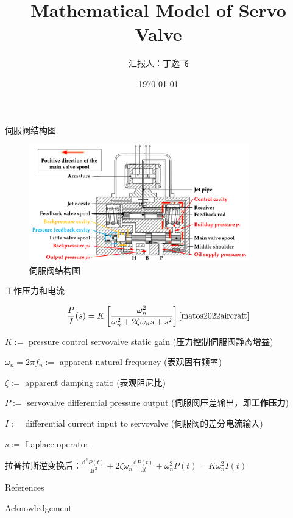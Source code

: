\documentclass[12pt,aspectratio=169]{beamer}
\title{Mathematical Model of Servo Valve}
\author{汇报人：丁逸飞}
\date{\today}
\begin{document}
\maketitle
\footnotesize

\begin{frame}{伺服阀结构图}

  \begin{figure}
    \begin{center}
      \includegraphics[width=0.85\textwidth]{fig/structure.png}
    \end{center}
    \caption{伺服阀结构图\cite{huang2022analysis}}\label{fig:1}
  \end{figure}

\end{frame}

\begin{frame}{工作压力和电流}

  \[
    \frac{P}{I}(s)=K\left[\frac{\omega_n^2}{\omega_n^2+2\zeta\omega_ns+s^2}\right]\text{\cite{matos2022aircraft}}
  \]

  $K:=$ pressure control servovalve static gain (压力控制伺服阀静态增益)

  $\omega_n=2\pi f_n:=$ apparent natural frequency (表观固有频率)

  $\zeta:=$ apparent damping ratio (表观阻尼比)

  $P:=$ servovalve differential pressure output (伺服阀压差输出，即\textbf{\color{ECNURed}工作压力})

  $I:=$ differential current input to servovalve (伺服阀的差分\textbf{\color{ECNURed}电流}输入)

  $s:=$ Laplace operator

  拉普拉斯逆变换后：$\displaystyle\frac{\textrm{d}^2P(t)}{\textrm{d}t^2}+2\zeta\omega_n
  \frac{\textrm{d}P(t)}{\textrm{d}t}+\omega_n^2P(t)=K\omega_n^2I(t)$

\end{frame}

\begin{frame}{References}
  
  \printbibliography[heading=none]

\end{frame}

\begin{frame}{Acknowledgement}

  \begin{center}

    \textcolor{gray}{\Huge{\centerline{}}}

  \end{center}

\end{frame}
\end{document}
